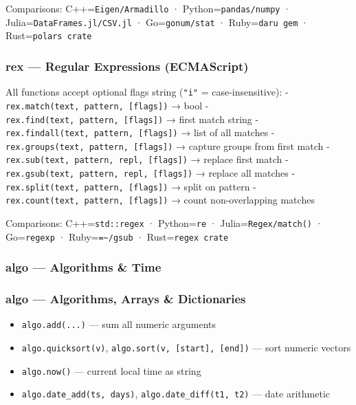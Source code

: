 \documentclass[
]{article}
\providecommand{\tightlist}{%
  \setlength{\itemsep}{0pt}\setlength{\parskip}{0pt}}
\begin{document}
Comparisons: C++=\texttt{Eigen/Armadillo} · Python=\texttt{pandas/numpy}
· Julia=\texttt{DataFrames.jl/CSV.jl} · Go=\texttt{gonum/stat} ·
Ruby=\texttt{daru\ gem} · Rust=\texttt{polars\ crate}

\subsubsection{rex --- Regular Expressions
(ECMAScript)}\label{rex-regular-expressions-ecmascript}

All functions accept optional flags string (\texttt{"i"} =
case-insensitive): - \texttt{rex.match(text,\ pattern,\ {[}flags{]})} →
bool - \texttt{rex.find(text,\ pattern,\ {[}flags{]})} → first match
string - \texttt{rex.findall(text,\ pattern,\ {[}flags{]})} → list of
all matches - \texttt{rex.groups(text,\ pattern,\ {[}flags{]})} →
capture groups from first match -
\texttt{rex.sub(text,\ pattern,\ repl,\ {[}flags{]})} → replace first
match - \texttt{rex.gsub(text,\ pattern,\ repl,\ {[}flags{]})} → replace
all matches - \texttt{rex.split(text,\ pattern,\ {[}flags{]})} → split
on pattern - \texttt{rex.count(text,\ pattern,\ {[}flags{]})} → count
non-overlapping matches

Comparisons: C++=\texttt{std::regex} · Python=\texttt{re} ·
Julia=\texttt{Regex/match()} · Go=\texttt{regexp} ·
Ruby=\texttt{=\textasciitilde{}/gsub} · Rust=\texttt{regex\ crate}

\subsubsection{algo --- Algorithms \& Time}\label{algo-algorithms-time}

\subsubsection{algo --- Algorithms, Arrays \&
Dictionaries}\label{algo-algorithms-arrays-dictionaries}

\begin{itemize}
\tightlist
\item
  \texttt{algo.add(...)} --- sum all numeric arguments
\item
  \texttt{algo.quicksort(v)},
  \texttt{algo.sort(v,\ {[}start{]},\ {[}end{]})} --- sort numeric
  vectors
\item
  \texttt{algo.now()} --- current local time as string
\item
  \texttt{algo.date\_add(ts,\ days)}, \texttt{algo.date\_diff(t1,\ t2)}
  --- date arithmetic
\end{itemize}
\end{document}
